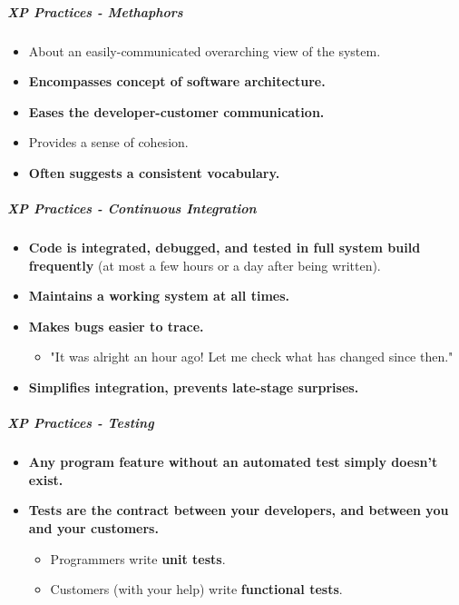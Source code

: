 \documentclass[a4paper]{article}
\providecommand{\tightlist}{%
  \setlength{\itemsep}{0pt}\setlength{\parskip}{0pt}}
\let\oldsubparagraph\subparagraph
\renewcommand{\subparagraph}[1]{\oldsubparagraph{#1}\mbox{}}
\begin{document}
\hypertarget{xp-practices---methaphors}{%
\subparagraph{XP Practices -
Methaphors}\label{xp-practices---methaphors}}

\begin{itemize}
\tightlist
\item
  About an easily-communicated overarching view of the system.
\item
  \textbf{Encompasses concept of software architecture.}
\item
  \textbf{Eases the developer-customer communication.}
\item
  Provides a sense of cohesion.
\item
  \textbf{Often suggests a consistent vocabulary.}
\end{itemize}

\hypertarget{xp-practices---continuous-integration}{%
\subparagraph{XP Practices - Continuous
Integration}\label{xp-practices---continuous-integration}}

\begin{itemize}
\tightlist
\item
  \textbf{Code is integrated, debugged, and tested in full system build
  frequently} (at most a few hours or a day after being written).
\item
  \textbf{Maintains a working system at all times.}
\item
  \textbf{Makes bugs easier to trace.}

  \begin{itemize}
  \tightlist
  \item
    "It was alright an hour ago! Let me check what has changed since
    then."
  \end{itemize}
\item
  \textbf{Simplifies integration, prevents late-stage surprises.}
\end{itemize}

\hypertarget{xp-practices---testing}{%
\subparagraph{XP Practices - Testing}\label{xp-practices---testing}}

\begin{itemize}
\tightlist
\item
  \textbf{Any program feature without an automated test simply doesn't
  exist.}
\item
  \textbf{Tests are the contract between your developers, and between
  you and your customers.}

  \begin{itemize}
  \tightlist
  \item
    Programmers write \textbf{unit tests}.
  \item
    Customers (with your help) write \textbf{functional tests}.
  \end{itemize}
\end{itemize}
\end{document}
